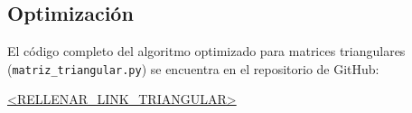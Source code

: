 \subsection{Optimización}
El código completo del algoritmo optimizado para matrices triangulares (\texttt{matriz\_triangular.py}) se encuentra en el repositorio de GitHub:

\begin{center}
\url{<RELLENAR_LINK_TRIANGULAR>}
\end{center}